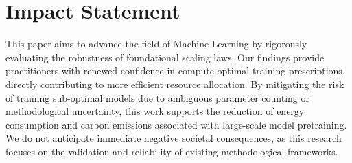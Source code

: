 \clearpage

\section{Impact Statement}
This paper aims to advance the field of Machine Learning by rigorously evaluating the robustness of foundational scaling laws. 
Our findings provide practitioners with renewed confidence in compute-optimal training prescriptions, directly contributing to more efficient resource allocation. 
By mitigating the risk of training sub-optimal models due to ambiguous parameter counting or methodological uncertainty, this work supports the reduction of energy consumption and carbon emissions associated with large-scale model pretraining.
We do not anticipate immediate negative societal consequences, as this research focuses on the validation and reliability of existing methodological frameworks.



\clearpage